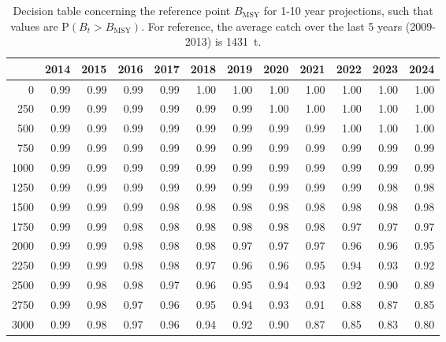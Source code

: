 \documentclass[11pt]{book}
\newcommand{\Bmsy}{B_\mathrm{MSY}}
\begin{document}
\begin{table}[!ht]
\centering
\caption{Decision table concerning the reference point $\Bmsy$ for 1-10 year projections, such that values are P$(B_t > \Bmsy)$. For reference, the average catch over the last 5 years (2009-2013) is 1431~t.} 
\label{tab:Bmsy}
\begin{tabular}{rrrrrrrrrrrr}
  \\[-1.0ex] \hline
 & 2014 & 2015 & 2016 & 2017 & 2018 & 2019 & 2020 & 2021 & 2022 & 2023 & 2024 \\ 
  \hline
0 & 0.99 & 0.99 & 0.99 & 0.99 & 1.00 & 1.00 & 1.00 & 1.00 & 1.00 & 1.00 & 1.00 \\ 
  250 & 0.99 & 0.99 & 0.99 & 0.99 & 0.99 & 0.99 & 1.00 & 1.00 & 1.00 & 1.00 & 1.00 \\ 
  500 & 0.99 & 0.99 & 0.99 & 0.99 & 0.99 & 0.99 & 0.99 & 0.99 & 1.00 & 1.00 & 1.00 \\ 
  750 & 0.99 & 0.99 & 0.99 & 0.99 & 0.99 & 0.99 & 0.99 & 0.99 & 0.99 & 0.99 & 0.99 \\ 
  1000 & 0.99 & 0.99 & 0.99 & 0.99 & 0.99 & 0.99 & 0.99 & 0.99 & 0.99 & 0.99 & 0.99 \\ 
  1250 & 0.99 & 0.99 & 0.99 & 0.99 & 0.99 & 0.99 & 0.99 & 0.99 & 0.99 & 0.98 & 0.98 \\ 
  1500 & 0.99 & 0.99 & 0.99 & 0.98 & 0.98 & 0.98 & 0.98 & 0.98 & 0.98 & 0.98 & 0.98 \\ 
  1750 & 0.99 & 0.99 & 0.98 & 0.98 & 0.98 & 0.98 & 0.98 & 0.98 & 0.97 & 0.97 & 0.97 \\ 
  2000 & 0.99 & 0.99 & 0.98 & 0.98 & 0.98 & 0.97 & 0.97 & 0.97 & 0.96 & 0.96 & 0.95 \\ 
  2250 & 0.99 & 0.99 & 0.98 & 0.98 & 0.97 & 0.96 & 0.96 & 0.95 & 0.94 & 0.93 & 0.92 \\ 
  2500 & 0.99 & 0.98 & 0.98 & 0.97 & 0.96 & 0.95 & 0.94 & 0.93 & 0.92 & 0.90 & 0.89 \\ 
  2750 & 0.99 & 0.98 & 0.97 & 0.96 & 0.95 & 0.94 & 0.93 & 0.91 & 0.88 & 0.87 & 0.85 \\ 
  3000 & 0.99 & 0.98 & 0.97 & 0.96 & 0.94 & 0.92 & 0.90 & 0.87 & 0.85 & 0.83 & 0.80 \\ 
   \hline
\end{tabular}
\end{table}
 \clearpage \pagebreak %
\end{document}
